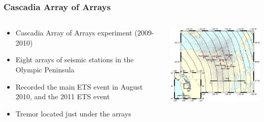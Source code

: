 \documentclass{beamer}
\begin{document}
	\begin{frame}
		\frametitle{Cascadia Array of Arrays}
		\begin{columns}[c]
			\begin{column}{5cm}
				\begin{itemize}
					\item Cascadia Array of Arrays experiment (2009-2010)


					\item Eight arrays of seismic stations in the Olympic Peninsula


					\item Recorded the main ETS event in August 2010, and the 2011 ETS event


					\item Tremor located just under the arrays
				\end{itemize}
			\end{column}
			\begin{column}{7cm}
				\begin{center}
					\includegraphics[trim={0cm 1cm 0cm 9.5cm}, clip, width=7cm]{AoA/arrays_location.eps}
				\end{center}
			\end{column}
		\end{columns}
	\end{frame}
\end{document}
